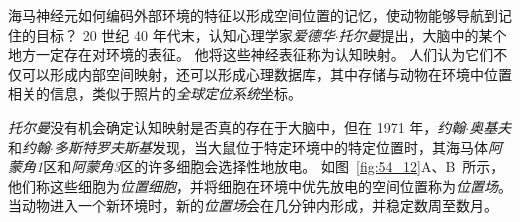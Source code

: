 海马神经元如何编码外部环境的特征以形成空间位置的记忆，使动物能够导航到记住的目标？
20 世纪 40 年代末，认知心理学家\textit{爱德华$\cdot$托尔曼}提出，大脑中的某个地方一定存在对环境的表征。
他将这些神经表征称为认知映射。
人们认为它们不仅可以形成内部空间映射，还可以形成心理数据库，其中存储与动物在环境中位置相关的信息，类似于照片的\textit{全球定位系统}坐标。


\textit{托尔曼}没有机会确定认知映射是否真的存在于大脑中，但在 1971 年，\textit{约翰$\cdot$奥基夫}和\textit{约翰$\cdot$多斯特罗夫斯基}发现，当大鼠位于特定环境中的特定位置时，其海马体\textit{阿蒙角1}区和\textit{阿蒙角3}区的许多细胞会选择性地放电。
如图~\ref{fig:54_12}A、B~所示，他们称这些细胞为\textit{位置细胞}，并将细胞在环境中优先放电的空间位置称为\textit{位置场}。
当动物进入一个新环境时，新的\textit{位置场}会在几分钟内形成，并稳定数周至数月。


